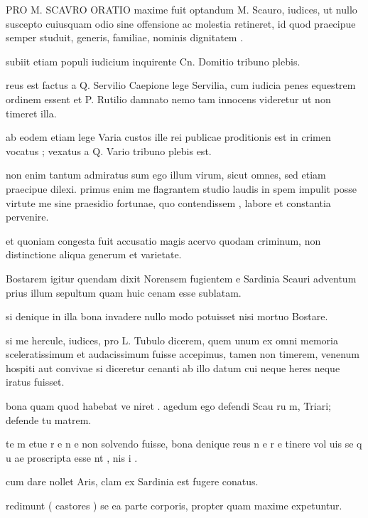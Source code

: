 
 PRO M. SCAVRO ORATIO maxime fuit optandum M. Scauro, iudices, ut nullo suscepto cuiusquam odio sine offensione ac molestia retineret, id quod praecipue semper studuit, generis, familiae, nominis dignitatem .

 subiit etiam populi iudicium inquirente Cn. Domitio tribuno plebis.

 reus est factus a Q. Servilio Caepione lege Servilia, cum iudicia penes equestrem ordinem essent et P. Rutilio damnato nemo tam innocens videretur ut non timeret illa.

 ab eodem etiam lege Varia custos ille rei publicae proditionis est in crimen vocatus ; vexatus a Q. Vario tribuno plebis est.

 non enim tantum admiratus sum ego illum virum, sicut omnes, sed etiam praecipue dilexi. primus enim me flagrantem studio laudis in spem impulit posse virtute me sine praesidio fortunae, quo contendissem , labore et constantia pervenire.

 et quoniam congesta fuit accusatio magis acervo quodam criminum, non distinctione aliqua generum et varietate.

 Bostarem igitur quendam dixit Norensem fugientem e Sardinia Scauri adventum prius illum sepultum quam huic cenam esse sublatam.

 si denique in illa bona invadere nullo modo potuisset nisi mortuo Bostare.

 si me hercule, iudices, pro L. Tubulo dicerem, quem unum ex omni memoria sceleratissimum et audacissimum fuisse accepimus, tamen non timerem, venenum hospiti aut convivae si diceretur cenanti ab illo datum cui neque heres neque iratus fuisset.

 bona quam quod habebat ve niret . agedum ego defendi Scau ru m, Triari; defende tu matrem.

 te m etue r e n e non solvendo fuisse, bona denique reus n e r e tinere vol uis se q u ae proscripta esse nt , nis i .

 cum dare nollet Aris, clam ex Sardinia est fugere conatus.

 redimunt ( castores ) se ea parte corporis, propter quam maxime expetuntur.

